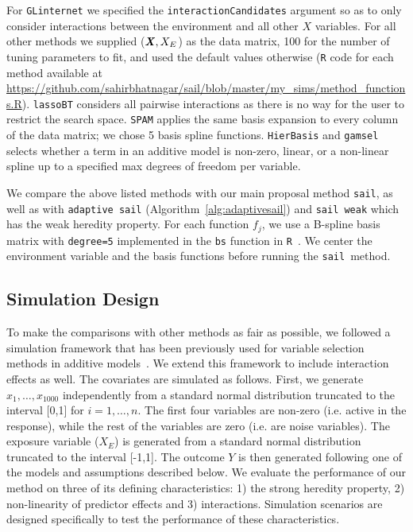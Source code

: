 \documentclass[a4paper,fleqn]{cas-sc}
\newcommand{\sail}{\texttt{sail}}
\newcommand{\bX}{\textbf{\emph{X}}}
\begin{document}
For \texttt{GLinternet} we specified the \texttt{interactionCandidates} argument so as to only consider interactions between the environment and all other $X$ variables. For all other methods we supplied ($\bX, X_E$) as the data matrix, 100 for the number of tuning parameters to fit, and used the default values otherwise (\texttt{R} code for each method available at \url{https://github.com/sahirbhatnagar/sail/blob/master/my_sims/method_functions.R}). \texttt{lassoBT} considers all pairwise interactions as there is no way for the user to restrict the search space. \texttt{SPAM} applies the same basis expansion to every column of the data matrix; we chose 5 basis spline functions. \texttt{HierBasis} and \texttt{gamsel} selects whether a term in an additive model is non-zero, linear, or a non-linear spline up to a specified max degrees of freedom per variable.

We compare the above listed methods with our main proposal method \texttt{sail}, as well as with \texttt{adaptive sail} (Algorithm~\ref{alg:adaptivesail}) and \texttt{sail weak} which has the weak heredity property. 
For each function $f_j$, we use a B-spline basis matrix with \texttt{degree=5} implemented in the \texttt{bs} function in \texttt{R}~\citep{cran}. 
We center the environment variable and the basis functions before running the \sail ~method.


\subsection{Simulation Design}
To make the comparisons with other methods as fair as possible, we followed a simulation framework that has been previously used for variable selection methods in additive models~\citep{lin2006component,huang2010variable}.
We extend this framework to include interaction effects as well.
The covariates are simulated as follows. 
First, we generate $x_1,\ldots, x_{1000}$ independently from a standard normal distribution truncated to the interval [0,1] for $i=1,\ldots,n$. 
The first four variables are non-zero (i.e. active in the response), while the rest of the variables are zero (i.e. are noise variables). The exposure variable ($X_E$) is generated from a standard normal distribution truncated to the interval [-1,1]. 
The outcome $Y$ is then generated following one of the models and assumptions described below. We evaluate the performance of our method on three of its defining characteristics: 1) the strong heredity property, 2) non-linearity of predictor effects and 3) interactions. 
Simulation scenarios are designed specifically to test the performance of these characteristics.
\end{document}
